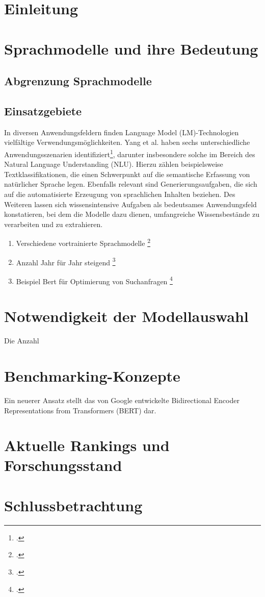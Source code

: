 \documentclass[a4paper, 12pt]{article}
\begin{document}



\newpage
\tableofcontents
\newpage
{}
\section{Einleitung}

\section{Sprachmodelle und ihre Bedeutung}
\subsection{Abgrenzung Sprachmodelle}
\newpage
\subsection{Einsatzgebiete}
In diversen Anwendungsfeldern finden Language Model (LM)-Technologien vielfältige Verwendungsmöglichkeiten. Yang et al. haben sechs unterschiedliche Anwendungsszenarien identifiziert\footcite[Vgl.][S. 6 ff.]{yang2023harnessing}, darunter insbesondere solche im Bereich des Natural Language Understanding (NLU). Hierzu zählen beispielsweise Textklassifikationen, die einen Schwerpunkt auf die semantische Erfassung von natürlicher Sprache legen. Ebenfalls relevant sind Generierungsaufgaben, die sich auf die automatisierte Erzeugung von sprachlichen Inhalten beziehen. Des Weiteren lassen sich wissensintensive Aufgaben als bedeutsames Anwendungsfeld konstatieren, bei dem die Modelle dazu dienen, umfangreiche Wissensbestände zu verarbeiten und zu extrahieren.
\begin{enumerate}
    \item Verschiedene vortrainierte Sprachmodelle \footcite{zhou2023comprehensive}
    \item Anzahl Jahr für Jahr steigend \footcite{naveed2023comprehensive}
    \item Beispiel Bert für Optimierung von Suchanfragen \footcite{devlin2018bert}
\end{enumerate}
\printbibliography



\newpage
\section{Notwendigkeit der Modellauswahl}
Die Anzahl

\section{Benchmarking-Konzepte}
Ein neuerer Ansatz stellt das von Google entwickelte Bidirectional Encoder Representations from Transformers (BERT) dar. 

\section{Aktuelle Rankings und Forschungsstand}

\section{Schlussbetrachtung}

\newpage
{}
\setcounter{page}{3}
\printbibliography
\end{document}
